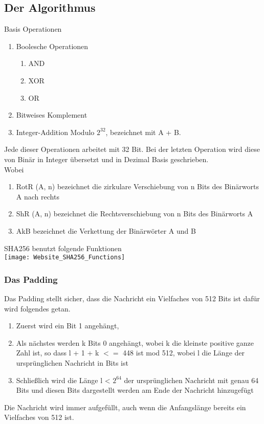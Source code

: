 {\subsection{Der Algorithmus}
\label{sec:hash_sha_alg}
Basis Operationen
\begin{enumerate}
\item Boolesche Operationen
\begin{enumerate}
\item AND
\item XOR
\item OR
\end{enumerate}
\item Bitweises Komplement
\item Integer-Addition Modulo $2^{32}$, bezeichnet mit A + B.
\end{enumerate}
Jede dieser Operationen arbeitet mit 32 Bit. Bei der letzten Operation wird diese von Binär in Integer übersetzt und in Dezimal Basis geschrieben.\\
Wobei
\begin{enumerate}
\item RotR (A, n) bezeichnet die zirkulare Verschiebung von n Bits des Binärworts A nach rechts
\item ShR (A, n) bezeichnet die Rechtsverschiebung von n Bits des Binärworts A
\item AkB bezeichnet die Verkettung der Binärwörter A und B
\end{enumerate}
SHA256 benutzt folgende Funktionen\\
\texttt{[image: Website\_SHA256\_Functions]}
\subsubsection{Das Padding}
\label{sec:hash_padd}
Das Padding stellt sicher, dass die Nachricht ein Vielfaches von 512 Bits ist dafür wird folgendes getan.
\begin{enumerate}
\item Zuerst wird ein Bit 1 angehängt,
\item Als nächstes werden k Bits 0 angehängt, wobei k die kleinste positive ganze Zahl ist, so dass l + 1 + k $<=$ 448 ist
mod 512, wobei l die Länge der ursprünglichen Nachricht in Bits ist
\item Schließlich wird die Länge l < $2^{64}$ der ursprünglichen Nachricht mit genau 64 Bits und diesen Bits dargestellt
werden am Ende der Nachricht hinzugefügt
\end{enumerate}
Die Nachricht wird immer aufgefüllt, auch wenn die Anfangslänge bereits ein Vielfaches von 512 ist.
}
